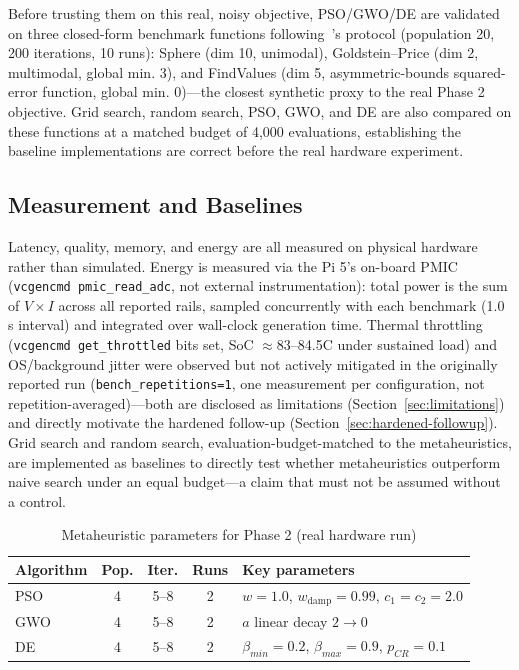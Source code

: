 \documentclass[conference, letterpaper]{IEEEtran}
\begin{document}
Before trusting them on this real, noisy objective, PSO/GWO/DE are validated on three closed-form benchmark functions following~\cite{ref11}'s protocol (population 20, 200 iterations, 10 runs): Sphere (dim 10, unimodal), Goldstein--Price (dim 2, multimodal, global min. 3), and FindValues (dim 5, asymmetric-bounds squared-error function, global min. 0)---the closest synthetic proxy to the real Phase 2 objective. Grid search, random search, PSO, GWO, and DE are also compared on these functions at a matched budget of 4,000 evaluations, establishing the baseline implementations are correct before the real hardware experiment.

\subsection{Measurement and Baselines}
\label{sec:measurement-protocol}
Latency, quality, memory, and energy are all measured on physical hardware rather than simulated. Energy is measured via the Pi 5's on-board PMIC (\texttt{vcgencmd pmic\_read\_adc}, not external instrumentation): total power is the sum of $V\times I$ across all reported rails, sampled concurrently with each benchmark (1.0 s interval) and integrated over wall-clock generation time. Thermal throttling (\texttt{vcgencmd get\_throttled} bits set, SoC $\approx$83--84.5\textdegree C under sustained load) and OS/background jitter were observed but not actively mitigated in the originally reported run (\texttt{bench\_repetitions=1}, one measurement per configuration, not repetition-averaged)---both are disclosed as limitations (Section~\ref{sec:limitations}) and directly motivate the hardened follow-up (Section~\ref{sec:hardened-followup}). Grid search and random search, evaluation-budget-matched to the metaheuristics, are implemented as baselines to directly test whether metaheuristics outperform naive search under an equal budget---a claim that must not be assumed without a control.

\begin{table}[t]
\caption{Metaheuristic parameters for Phase 2 (real hardware run)}
\label{tab:meta-params}
\centering
\footnotesize
\begin{tabular}{@{}lcccl@{}}
\toprule
Algorithm & Pop. & Iter. & Runs & Key parameters \\
\midrule
PSO & 4 & 5--8 & 2 & $w{=}1.0$, $w_{\text{damp}}{=}0.99$, $c_1{=}c_2{=}2.0$ \\
GWO & 4 & 5--8 & 2 & $a$ linear decay $2\to0$ \\
DE  & 4 & 5--8 & 2 & $\beta_{min}{=}0.2$, $\beta_{max}{=}0.9$, $p_{CR}{=}0.1$ \\
\bottomrule
\end{tabular}
\end{table}
\end{document}
